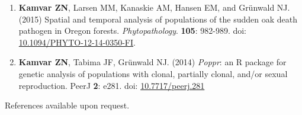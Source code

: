 \documentclass[10pt,letterpaper,sans]{modernresume} %
\begin{document}
\begin{enumerate}

	\item \textbf{Kamvar ZN}, Larsen MM, Kanaskie AM, Hansen EM, and Gr\"unwald
	NJ. (2015) Spatial and temporal analysis of populations of the sudden oak
	death pathogen in Oregon forests. \textit{Phytopathology}. \textbf{105}:
	982-989. doi: 
	\href{http://dx.odi.org/10.1094/PHYTO-12-14-0350-FI}{10.1094/PHYTO-12-14-0350-FI}.

    \item \textbf{Kamvar ZN}, Tabima JF, Gr\"unwald NJ. (2014) \textit{Poppr}: an
	R package for genetic analysis of populations with clonal, partially clonal,
	and/or sexual reproduction. PeerJ \textbf{2}: e281. doi:
	\href{http://dx.doi.org/10.7717/peerj.281}{10.7717/peerj.281}

\end{enumerate}





\vspace{6pt}

References available upon request.





\end{document}
